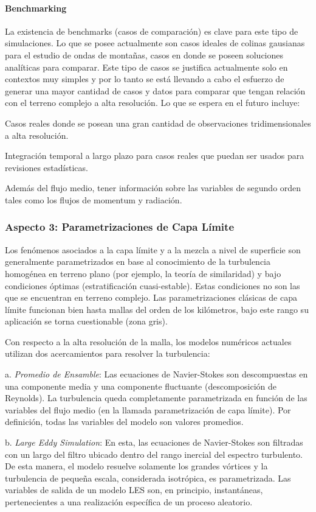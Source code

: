 \paragraph{Benchmarking} La existencia de benchmarks (casos de comparación) es clave para este tipo de simulaciones. Lo que se posee actualmente son casos ideales de colinas gausianas para el estudio de ondas de montañas, casos en donde se poseen soluciones analíticas para comparar. Este tipo de casos se justifica actualmente solo en contextos muy simples y por lo tanto se está llevando a cabo el esfuerzo de generar una mayor cantidad de casos y datos para comparar que tengan relación con el terreno complejo a alta resolución. Lo que se espera en el futuro incluye:
\begin{itemize*}
	\item Casos reales donde se posean una gran cantidad de observaciones tridimensionales a alta resolución.
	\item Integración temporal a largo plazo para casos reales que puedan ser usados para revisiones estadísticas.
	\item Además del flujo medio, tener información sobre las variables de segundo orden tales como los flujos de momentum y radiación.
\end{itemize*} 
\subsubsection{Aspecto 3: Parametrizaciones de Capa Límite}
Los fenómenos asociados a la capa límite y a la mezcla a nivel de superficie son generalmente parametrizados en base al conocimiento de la turbulencia homogénea en terreno plano (por ejemplo, la teoría de similaridad) y bajo condiciones óptimas (estratificación cuasi-estable). Estas condiciones no son las que se encuentran en terreno complejo. Las parametrizaciones clásicas de capa límite funcionan bien hasta mallas del orden de los kilómetros, bajo este rango su aplicación se torna cuestionable (zona gris).

Con respecto a la alta resolución de la malla, los modelos numéricos actuales utilizan dos acercamientos para resolver la turbulencia:
\begin{enumerate*}
	\item[a.] \emph{Promedio de Ensamble}: Las ecuaciones de Navier-Stokes son descompuestas en una componente media y una componente fluctuante (descomposición de Reynolds). La turbulencia queda completamente parametrizada en función de las variables del flujo medio (en la llamada parametrización de capa límite). Por definición, todas las variables del modelo son valores promedios.
	\item[b.] \emph{Large Eddy Simulation}: En esta, las ecuaciones de Navier-Stokes son filtradas con un largo del filtro ubicado dentro del rango inercial del espectro turbulento. De esta manera, el modelo resuelve solamente los grandes vórtices y la turbulencia de pequeña escala, considerada isotrópica, es parametrizada. Las variables de salida de un modelo LES son, en principio, instantáneas, pertenecientes a una realización específica de un proceso aleatorio.
\end{enumerate*} 

